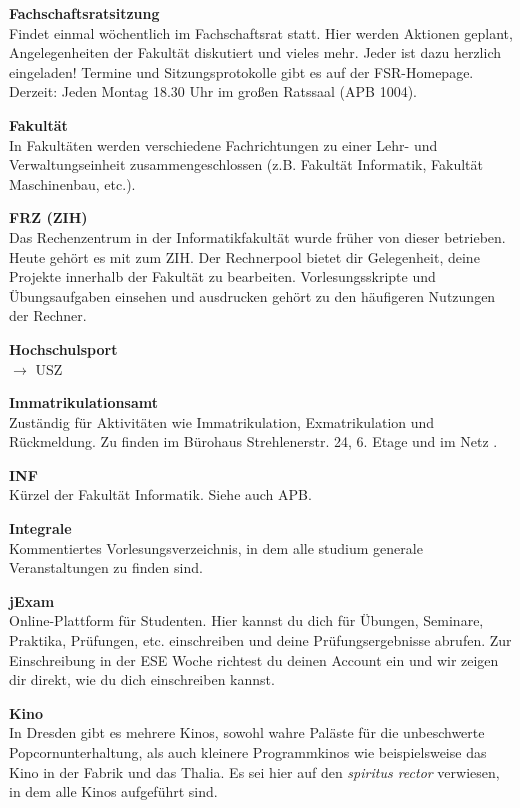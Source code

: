 \textbf{Fachschaftsratsitzung} \\
Findet einmal wöchentlich im Fachschaftsrat statt.
Hier werden Aktionen geplant, Angelegenheiten der Fakultät diskutiert und vieles mehr.
Jeder ist dazu herzlich eingeladen!
Termine und Sitzungsprotokolle gibt es auf der FSR-Homepage.
Derzeit:
Jeden Montag 18.30 Uhr im großen Ratssaal (APB 1004).

\textbf{Fakultät} \\
In Fakultäten werden verschiedene Fachrichtungen zu einer Lehr- und Verwaltungseinheit zusammengeschlossen (z.B. Fakultät Informatik, Fakultät Maschinenbau, etc.).

\textbf{FRZ (ZIH)} \\
Das Rechenzentrum in der Informatikfakultät wurde früher von dieser betrieben.
Heute gehört es mit zum ZIH.
Der Rechnerpool bietet dir Gelegenheit, deine Projekte innerhalb der Fakultät zu bearbeiten.
Vorlesungsskripte und Übungsaufgaben einsehen und ausdrucken gehört zu den häufigeren Nutzungen der Rechner.

\textbf{Hochschulsport} \\
$\rightarrow$ USZ

\textbf{Immatrikulationsamt} \\
Zuständig für Aktivitäten wie Immatrikulation, Exmatrikulation und Rückmeldung.
Zu finden im Bürohaus Strehlenerstr. 24, 6. Etage und im Netz .

\textbf{INF} \\
Kürzel der Fakultät Informatik. 
Siehe auch APB.

\textbf{Integrale} \\
Kommentiertes Vorlesungsverzeichnis, in dem alle studium generale Veranstaltungen zu finden sind.

\textbf{jExam} \\
Online-Plattform für Studenten.
Hier kannst du dich für Übungen, Seminare, Praktika, Prüfungen, etc. einschreiben und deine Prüfungsergebnisse abrufen.
Zur Einschreibung in der ESE Woche richtest du deinen Account ein und wir zeigen dir direkt, wie du dich einschreiben kannst.

\textbf{Kino} \\
In Dresden gibt es mehrere Kinos, sowohl wahre Paläste für die unbeschwerte Popcornunterhaltung, als auch kleinere Programmkinos wie beispielsweise das Kino in der Fabrik und das Thalia.
Es sei hier auf den \textit{spiritus rector} verwiesen, in dem alle Kinos aufgeführt sind.

